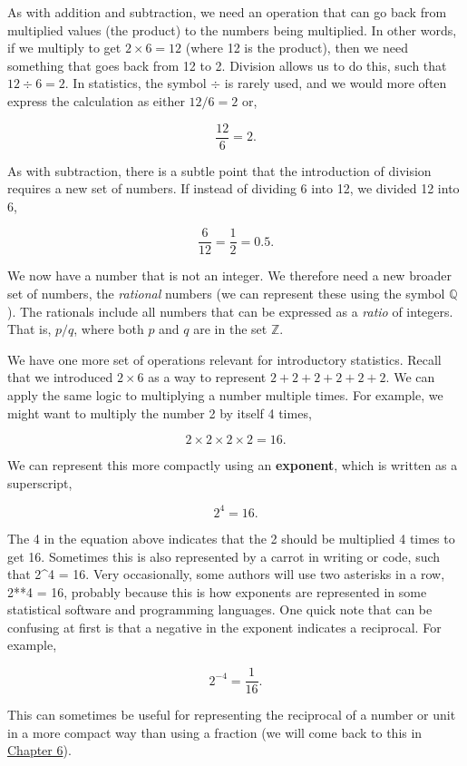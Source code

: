 \documentclass[
  openany]{krantz}
\begin{document}
As with addition and subtraction, we need an operation that can go back from multiplied values (the product) to the numbers being multiplied.
In other words, if we multiply to get \(2 \times 6 = 12\) (where 12 is the product), then we need something that goes back from 12 to 2.
Division allows us to do this, such that \(12 \div 6 = 2\).
In statistics, the symbol \(\div\) is rarely used, and we would more often express the calculation as either \(12/6 = 2\) or,

\[\frac{12}{6} = 2.\]

As with subtraction, there is a subtle point that the introduction of division requires a new set of numbers.
If instead of dividing 6 into 12, we divided 12 into 6,

\[\frac{6}{12} = \frac{1}{2} = 0.5.\]

We now have a number that is not an integer.
We therefore need a new broader set of numbers, the \emph{rational} numbers (we can represent these using the symbol \(\mathbb{Q}\)).
The rationals include all numbers that can be expressed as a \emph{ratio} of integers.
That is, \(p / q\), where both \(p\) and \(q\) are in the set \(\mathbb{Z}\).

We have one more set of operations relevant for introductory statistics.
Recall that we introduced \(2 \times 6\) as a way to represent \(2 + 2 + 2 + 2 + 2 + 2\).
We can apply the same logic to multiplying a number multiple times.
For example, we might want to multiply the number 2 by itself 4 times,

\[2 \times 2 \times 2 \times 2 = 16.\]

We can represent this more compactly using an \textbf{exponent}, which is written as a superscript,

\[2^{4} = 16.\]

The 4 in the equation above indicates that the 2 should be multiplied 4 times to get 16.
Sometimes this is also represented by a carrot in writing or code, such that 2\^{}4 = 16.
Very occasionally, some authors will use two asterisks in a row, 2**4 = 16, probably because this is how exponents are represented in some statistical software and programming languages.
One quick note that can be confusing at first is that a negative in the exponent indicates a reciprocal.
For example,

\[2^{-4} = \frac{1}{16}.\]

This can sometimes be useful for representing the reciprocal of a number or unit in a more compact way than using a fraction (we will come back to this in \protect\hyperlink{Chapter_6}{Chapter 6}).
\end{document}
